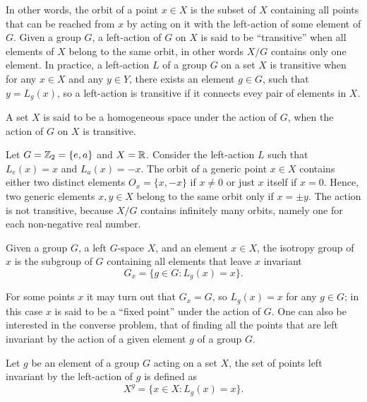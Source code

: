 In other words, the orbit of a point $x \in X$ is the subset of $X$ containing all points that can be reached from $x$ by acting on it with the left-action of some element of $G$. Given a group $G$, a left-action of $G$ on $X$ is said to be ``transitive'' when all elements of $X$ belong to the same orbit, in other words $X/G$ contains only one element. In practice, a left-action $L$ of a group $G$ on a set $X$ is transitive when for any $x \in X$ and any $y \in Y$, there exists an element $g \in G$, such that $y = L_g(x)$, so a left-action is transitive if it connects evey pair of elements in $X$. 
\begin{defn}
    A set $X$ is said to be a homogeneous space under the action of $G$, when the action of $G$ on $X$ is transitive.
\end{defn}
\begin{ex}
    Let $G = \mathbb{Z}_2 = \{e,a\}$ and $X = \mathbb{R}$. Consider the left-action $L$ such that $L_e(x) = x$ and $L_a(x) = -x$. The orbit of a generic point $x \in X$ contains either two distinct elements $O_x = \{x,-x\}$ if $x \neq 0$ or just $x$ itself if $x = 0$. Hence, two generic elements $x,y \in X$ belong to the same orbit only if $x = \pm y$. The action is not transitive, because $X/G$ contains infinitely many orbits, namely one for each non-negative real number.
\end{ex}
\begin{defn}
    Given a group $G$, a left $G$-space $X$, and an element $x \in X$, the isotropy group of $x$ is the subgroup of $G$ containing all elements that leave $x$ invariant
    \begin{equation}
        G_x = \{g \in G : L_g(x) = x\}.
    \end{equation}
\end{defn}
For some points $x$ it may turn out that $G_x = G$, so $L_g(x) = x$ for any $g \in G$; in this case $x$ is said to be a ``fixed point'' under the action of $G$. One can also be interested in the converse problem, that of finding all the points that are left invariant by the action of a given element $g$ of a group $G$. 
\begin{defn}
    Let $g$ be an element of a group $G$ acting on a set $X$, the set of points left invariant by the left-action of $g$ is defined as
    \begin{equation}
        X^g = \{x \in X : L_g(x) = x\}.
    \end{equation}
\end{defn}
